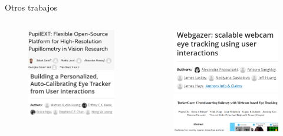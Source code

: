 \documentclass[aspectratio=169]{beamer}
\begin{document}
\begin{frame}{Otros trabajos}
  \begin{columns}
    \begin{column}{0.5\textwidth}
      \begin{figure}
        \centering
        \includegraphics[width=0.8\linewidth]{img/pupil-ext.png}
        \includegraphics[width=0.8\linewidth]{img/PACE.png}
      \end{figure}
    \end{column}

    \begin{column}{0.5\textwidth}
      \begin{figure}
        \centering
        \includegraphics[width=0.7\linewidth]{img/webgazer.png}
        \includegraphics[width=\linewidth]{img/turker-gaze.png}
      \end{figure}
    \end{column}
  \end{columns}
\end{frame}
\end{document}
